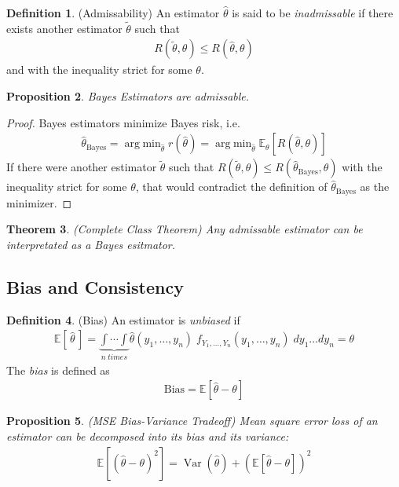 \documentclass[12pt]{article}
\theoremstyle{plain}
\newtheorem{thm}{Theorem}[section]
\newtheorem{prop}[thm]{Proposition}
\theoremstyle{definition}
\newtheorem{defn}[thm]{Definition}
\theoremstyle{remark}
\newcommand{\E}{\mathbb{E}}
\DeclareMathOperator*{\argmin}{arg\;min}
\newcommand{\Var}{\operatorname{Var}}
\begin{document}
\begin{defn}(Admissability)
An estimator $\hat{\theta}$ is said to be \emph{inadmissable} if there
exists another estimator $\tilde{\theta}$ such that
\begin{align*}
  R(\tilde{\theta},\theta)
  \leq
  R(\hat{\theta},\theta)
\end{align*}
and with the inequality strict for some $\theta$.
\end{defn}

\begin{prop}
Bayes Estimators are admissable.
\end{prop}
\begin{proof}
Bayes estimators minimize Bayes risk, i.e.
\begin{align*}
  \hat{\theta}_\text{Bayes}
  = \argmin_{\hat{\theta}} r(\hat{\theta})
  = \argmin_{\hat{\theta}}\E_\theta[R(\hat{\theta},\theta)]
\end{align*}
If there were another estimator $\tilde{\theta}$ such that
$R(\tilde{\theta},\theta)\leq R(\hat{\theta}_\text{Bayes},\theta)$ with
the inequality strict for some $\theta$, that would contradict the
definition of $\hat{\theta}_\text{Bayes}$ as the minimizer.
\end{proof}

\begin{thm}\emph{(Complete Class Theorem)}
Any admissable estimator can be interpretated as a Bayes esitmator.
\end{thm}

\subsection{Bias and Consistency}


\begin{defn}(Bias)
An estimator is \emph{unbiased} if
\begin{align*}
  \E\left[\,\hat{\theta}\,\right] =
  \underbrace{\int \cdots \int}_{n\; times}
      \hat{\theta}(y_1,\ldots,y_n) \;
      f_{Y_1,\ldots,Y_n}(y_1,\ldots,y_n) \; dy_1 \ldots dy_n = \theta
\end{align*}
The \emph{bias} is defined as
\begin{align*}
  \text{Bias} = \E[\hat{\theta}-\theta]
\end{align*}
\end{defn}

\begin{prop}\emph{(MSE Bias-Variance Tradeoff)}
Mean square error loss of an estimator can be decomposed into its bias
and its variance:
\begin{align*}
  \E[(\hat{\theta}-\theta)^2]
  =\Var(\hat{\theta}) + \left(\E[\hat{\theta}-\theta]\right)^2
\end{align*}
\end{prop}
\end{document}
